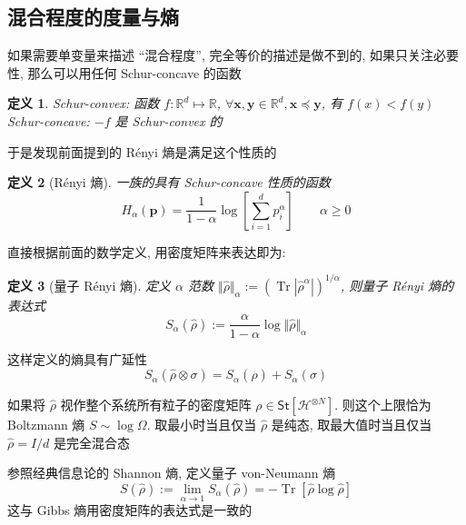 \documentclass[12pt,a4paper]{article}
\renewcommand*{\vec}[1]{\bm{#1}}
\newcommand{\Tr}{\operatorname{Tr}}
\newcommand{\St}{{\mathsf{St}}}
\newtheorem{definition}{定义}
\begin{document}
\subsection{混合程度的度量与熵} %
\label{sub:mixedness_and_entropy}
    如果需要单变量来描述 ``混合程度'', 完全等价的描述是做不到的, 
    如果只关注必要性, 那么可以用任何 Schur-concave 的函数
    \begin{definition}
        Schur-convex: 函数 $f:\mathbb R^d\mapsto\mathbb R$, 
        $\forall \vec x,\vec y\in\mathbb R^d, \vec x\preceq \vec y$, 有 $f(x)<f(y)$ \\
        Schur-concave: $-f$ 是 Schur-convex 的
    \end{definition}
    于是发现前面提到的 R\'enyi 熵是满足这个性质的
    \begin{definition}[R\'enyi 熵]
        一族的具有 Schur-concave 性质的函数
        \begin{equation}
            H_\alpha(\vec p) = \frac1{1-\alpha}\log\left[\sum_{i=1}^dp_i^\alpha\right]\qquad\alpha\ge 0
        \end{equation}
    \end{definition}
    直接根据前面的数学定义, 用密度矩阵来表达即为:
    \begin{definition}[量子 R\'enyi 熵]
        定义 $\alpha$ 范数 
        $\Vert\hat\rho\Vert_\alpha := \left(\Tr|\hat\rho^\alpha|\right)^{1/\alpha}$, 
        则量子 R\'enyi 熵的表达式
        \begin{equation}
            S_\alpha(\hat\rho) := \frac{\alpha}{1-\alpha}\log\Vert\hat\rho\Vert_\alpha
        \end{equation}
    \end{definition}
    这样定义的熵具有广延性
    \begin{equation}
        S_\alpha(\hat\rho\otimes\sigma) = S_\alpha(\hat\rho) + S_\alpha(\sigma)
    \end{equation}

    如果将 $\hat \rho$ 视作整个系统所有粒子的密度矩阵 $\rho\in\St[\mathcal H^{\otimes N}]$.
    则这个上限恰为 Boltzmann 熵 $S\sim\log\Omega$.
    取最小时当且仅当 $\hat\rho$ 是纯态, 取最大值时当且仅当 $\hat\rho = I/d$ 是完全混合态

    参照经典信息论的 Shannon 熵, 定义量子 von-Neumann 熵\cite{neumann1932mathematische}
    \begin{equation}
        S(\hat\rho):=\lim_{\alpha\to 1}S_\alpha(\hat\rho) = -\Tr[\hat\rho\log\hat\rho]
    \end{equation}
    这与 Gibbs 熵用密度矩阵的表达式是一致的
\end{document}
